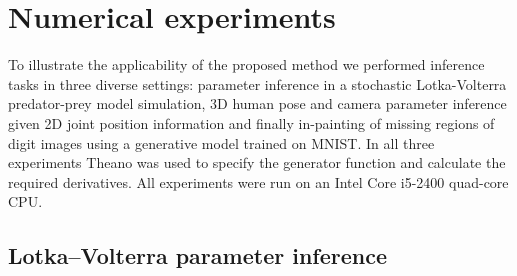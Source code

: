 \section{Numerical experiments}\label{sec:dgm-experiments}

To illustrate the applicability of the proposed method we performed inference tasks in three diverse settings: parameter inference in a stochastic Lotka-Volterra predator-prey model simulation, 3D human pose and camera parameter inference given 2D joint position information and finally in-painting of missing regions of digit images using a generative model trained on MNIST. In all three experiments Theano \citep{theano2016theano} was used to specify the generator function and calculate the required derivatives. All experiments were run on an Intel Core i5-2400 quad-core CPU. %

\subsection{Lotka--Volterra parameter inference}

